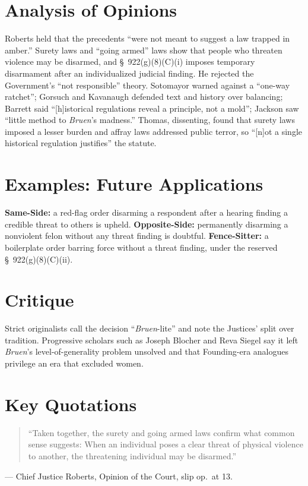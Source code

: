 \documentclass[12pt]{article}
\begin{document}
\section{Analysis of Opinions}
Roberts held that the precedents ``were not meant to suggest a law trapped in amber.'' Surety laws and ``going armed'' laws show that people who threaten violence may be disarmed, and \S\ 922(g)(8)(C)(i) imposes temporary disarmament after an individualized judicial finding. He rejected the Government's ``not responsible'' theory. Sotomayor warned against a ``one-way ratchet''; Gorsuch and Kavanaugh defended text and history over balancing; Barrett said ``[h]istorical regulations reveal a principle, not a mold''; Jackson saw ``little method to \textit{Bruen}'s madness.'' Thomas, dissenting, found that surety laws imposed a lesser burden and affray laws addressed public terror, so ``[n]ot a single historical regulation justifies'' the statute.

\section{Examples: Future Applications}
\textbf{Same-Side:} a red-flag order disarming a respondent after a hearing finding a credible threat to others is upheld. \textbf{Opposite-Side:} permanently disarming a nonviolent felon without any threat finding is doubtful. \textbf{Fence-Sitter:} a boilerplate order barring force without a threat finding, under the reserved \S\ 922(g)(8)(C)(ii).

\section{Critique}
Strict originalists call the decision ``\textit{Bruen}-lite'' and note the Justices' split over tradition. Progressive scholars such as Joseph Blocher and Reva Siegel say it left \textit{Bruen}'s level-of-generality problem unsolved and that Founding-era analogues privilege an era that excluded women.

\section{Key Quotations}
\begin{quote}
``Taken together, the surety and going armed laws confirm what common sense suggests: When an individual poses a clear threat of physical violence to another, the threatening individual may be disarmed.''
\end{quote}
\noindent --- Chief Justice Roberts, Opinion of the Court, slip op.\ at 13.
\end{document}
